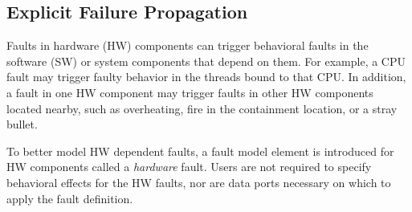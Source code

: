 \subsection{Explicit Failure Propagation} 


Faults in hardware (HW) components can trigger behavioral faults in the software (SW) or system components that depend on them. For example, a CPU fault may trigger faulty behavior in the threads bound to that CPU. In addition, a fault in one HW component may trigger faults in other HW components located nearby, such as overheating, fire in the containment location, or a stray bullet. 

To better model HW dependent faults, a fault model element is introduced for HW components called a \textit{hardware} fault. Users are not required to specify behavioral effects for the HW faults, nor are data ports necessary on which to apply the fault definition. 




